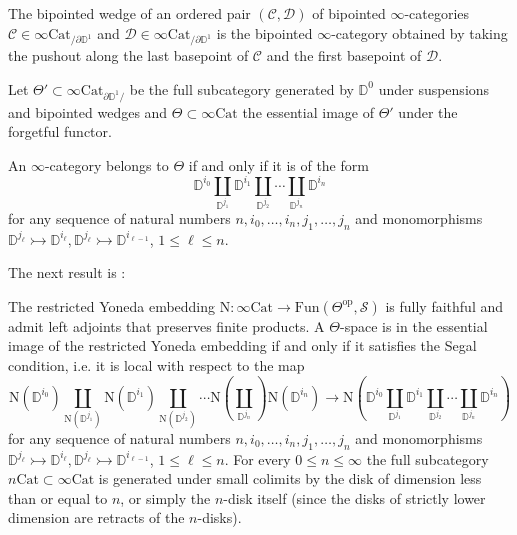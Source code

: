 \documentclass[10pt,oneside]{article}
\numberwithin{equation}{section} %
\numberwithin{figure}{section} %
\theoremstyle{plain}
\theoremstyle{definition}
\newcommand{\bD}{{\mathbb D}}
\newcommand{\mC}{{\mathcal C}}
\newcommand{\mD}{{\mathcal D}}
\newcommand{\mS}{{\mathcal S}}
\newcommand{\N}{{\mathrm N}}
\newcommand{\op}{\mathrm{op}}
\newcommand{\Cat}{\mathrm{Cat}}
\newcommand{\Fun}{\mathrm{Fun}}
\begin{document}
\begin{definition}
The bipointed wedge of an ordered pair $(\mC,\mD)$ of bipointed $\infty$-categories  $\mC\in\infty\Cat_{/\partial\bD^1}$ and $\mD\in\infty\Cat_{/\partial\bD^1}$ is the bipointed $\infty$-category obtained by taking the pushout along the last basepoint of $\mC$ and the first basepoint of $\mD$.
\end{definition}

\begin{definition}\label{Theta}
	
Let $\Theta' \subset \infty\Cat_{\partial\bD^1/}$ be the full subcategory generated by $\bD^0$ under suspensions and bipointed wedges and $\Theta \subset \infty\Cat$ the essential image of $\Theta'$ under the forgetful functor.	
	
\end{definition}

\begin{remark}

An $\infty$-category belongs to $\Theta$ if and only if it is of the form $$ \bD^{i_0} \coprod_{\bD^{j_1}} \bD^{i_1} \coprod_{\bD^{j_2}} \cdots \coprod_{\bD^{j_n}} \bD^{i_n} $$
for any sequence of natural numbers $n, i_0,\ldots, i_n, j_1,\ldots, j_n$ and monomorphisms 
$ \bD^{j_\ell} \rightarrowtail \bD^{i_\ell},\bD^{j_\ell} \rightarrowtail \bD^{i_{\ell-1}}$, $ 1 \leq \ell \leq n$.

\end{remark}

The next result is \cite[Theorem 2.5.8]{GepnerHeine2026}:

\begin{theorem}\label{theta}

The restricted Yoneda embedding $\N:
\infty\Cat \to \Fun(\Theta^\op,\mS)$ is fully faithful and admit left adjoints that preserves finite products.
A $\Theta$-space is in the essential image of the restricted Yoneda embedding if and only if it satisfies the Segal condition, i.e. it is local with respect to the map 
$$ \N(\bD^{i_0}) \coprod_{\N(\bD^{j_1})} \N(\bD^{i_1})\coprod_{\N(\bD^{j_2})} \cdots \N(\coprod_{\bD^{j_n}}) \N(\bD^{i_n}) \to \N(\bD^{i_0} \coprod_{\bD^{j_1}} \bD^{i_1} \coprod_{\bD^{j_2}} \cdots \coprod_{\bD^{j_n}} \bD^{i_n}) $$
for any sequence of natural numbers $n, i_0,\ldots, i_n, j_1,\ldots, j_n$ and monomorphisms 
$ \bD^{j_\ell} \rightarrowtail \bD^{i_\ell},\bD^{j_\ell} \rightarrowtail \bD^{i_{\ell-1}}$, $ 1 \leq \ell \leq n$.
For every $ 0 \leq n \leq \infty$ the full subcategory $n\Cat \subset \infty\Cat$ is generated under small colimits by the disk of dimension less than or equal to $n$, or simply the $n$-disk itself (since the disks of strictly lower dimension are retracts of the $n$-disks).

\end{theorem}
\end{document}

